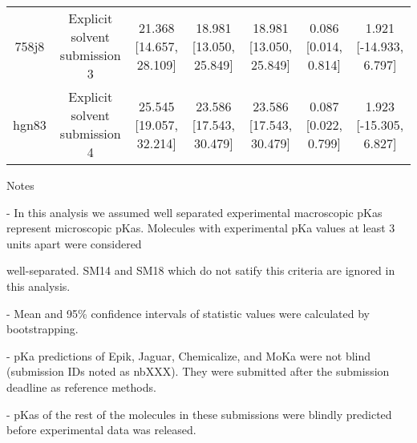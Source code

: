 \documentclass{article}
\begin{document}
\begin{center}
\begin{longtable}{|ccccccc|}
 758j8 &                      Explicit solvent submission 3 &  21.368 [14.657, 28.109] &  18.981 [13.050, 25.849] &  18.981 [13.050, 25.849] &  0.086 [0.014, 0.814] &  1.921 [-14.933, 6.797] \\
 hgn83 &                      Explicit solvent submission 4 &  25.545 [19.057, 32.214] &  23.586 [17.543, 30.479] &  23.586 [17.543, 30.479] &  0.087 [0.022, 0.799] &  1.923 [-15.305, 6.827] \\
\end{longtable}
\end{center}

Notes

- In this analysis we assumed well separated experimental macroscopic pKas represent microscopic pKas. Molecules with experimental pKa values at least 3 units apart were considered

well-separated. SM14 and SM18 which do not satify this criteria are ignored in this analysis.

- Mean and 95\% confidence intervals of statistic values were calculated by bootstrapping.

- pKa predictions of Epik, Jaguar, Chemicalize, and MoKa were not blind (submission IDs noted as nbXXX). They were submitted after the submission deadline as reference methods.

- pKas of the rest of the molecules in these submissions were blindly predicted before experimental data was released.
\end{document}
